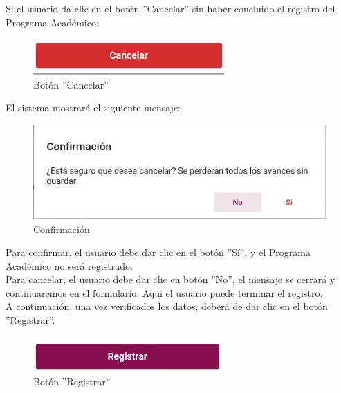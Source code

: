         Si el usuario da clic en el botón ''Cancelar'' sin haber concluido el registro del Programa Académico:

        \begin{figure}[!hbtp]
            \centering
            \hypertarget{cancel1}{\includegraphics[width=0.7\linewidth]{images/SP3/BtnCancelar}}
            \caption{Botón ''Cancelar''}
            \label{cancel1}
        \end{figure}

         El sistema mostrará el siguiente mensaje:

        \begin{figure}[!hbtp]
            \centering
            \hypertarget{confirmar}{\includegraphics[width=0.7\linewidth]{images/SP3/Confirmacion}}
            \caption{Confirmación}
            \label{confirmar}
        \end{figure}

        Para confirmar, el usuario debe dar clic en el botón ''Sí'', y el Programa Académico no será registrado.\\

        Para cancelar, el usuario debe dar clic en botón ''No'', el mensaje se cerrará y continuaremos en el formulario. Aqui el usuario puede terminar el registro.\\

        A continuación, una vez verificados los datos, deberá de dar clic en el botón ''Registrar''.
        \begin{figure}[!hbtp]
            \centering
            \hypertarget{btnreg}{\includegraphics[width=0.7\linewidth]{images/SP3/BtnRegistrar}}
            \caption{Botón ''Registrar''}
            \label{btnreg}
        \end{figure}

